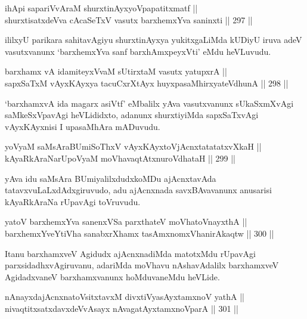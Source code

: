 \begin{shl}
ihApi sapariVvAraM shurxtinAyxyoVpapatitxmatf || \\
shurxtisatxdeVva cA\s \s caSeTxV vasutx barxhemxYva saninxti \hfill || 297 ||  
\end{shl}

\begin{artha}
ililxyU parikara sahitavAgiyu shurxtinAyxya yukitxgaLiMda kUDiyU iruva
adeV vasutxvanunx `barxhemxYva sanf barxhAmxpeyxVti' eMdu heVLuvudu.
\end{artha}

\begin{shl}
barxhamx vA idamiteyxVvaM sUtirxtaM vasutx yatupxrA || \\
sapxSaTxM vAyxKAyxya tacuCxrXtAyx huyxpasaMhirxyateV\s dhunA \hfill || 298 ||  
\end{shl}

\begin{artha}
`barxhamxvA ida magarx asiVtf' eMbalilx yAva vasutxvanunx sUkaSxmXvAgi
saMkeSxVpavAgi heVLididxto, adanunx shurxtiyiMda sapxSaTxvAgi
vAyxKAyxnisi I upasaMhAra mADuvudu.
\end{artha}


\begin{shl}
yoV\s yaM saMsAraBUmiSoThxV vAyxKAyxtoV\s jAcnxtatatatxvXkaH || \\
kAyaRkAraNarUpoV\s yaM moVhavaqtAtxnuroVdhataH \hfill || 299 ||  
\end{shl}

\begin{artha}
yAva idu saMsAra BUmiyalilxdudxkoMDu ajAcnxtavAda
tatavxvuLaLxdAdxgiruvudo, adu ajAcnxnada savxBAvavanunx anusarisi
kAyaRkAraNa rUpavAgi toVruvudu.
\end{artha}

\begin{shl}
yatoV barxhemxYva sanenxVSa parxthateV moVhatoV\s nayxthA || \\
barxhemxYveYtiVha sanabxrXhamx tasAmxnomxVhanirAkaqtw \hfill || 300 ||  
\end{shl}

\begin{artha}
Itanu barxhamxveV Agidudx ajAcnxnadiMda matotxMdu rUpavAgi
parxsidadhxvAgiruvanu, adariMda moVhavu nAshavAdalilx barxhamxveV
AgidadxvaneV barxhamxvanunx hoMduvaneMdu heVLide.
\end{artha}

\begin{shl}
nAnayxdajAcnxnatoV\s sitxtavxM divxtiVyasAyx\s \s tamxnoV yathA || \\
nivaqtitxsatxdavxdeVvAsayx nAvagatAyxtamxnoV\s parA \hfill || 301 ||  
\end{shl}

